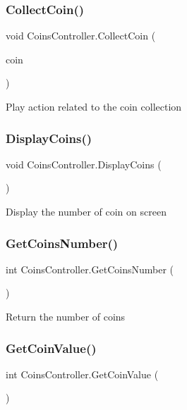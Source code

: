 \subsubsection{\texorpdfstring{Collect\+Coin()}{CollectCoin()}}
{\footnotesize\ttfamily void Coins\+Controller.\+Collect\+Coin (\begin{DoxyParamCaption}\item[{Game\+Object}]{coin }\end{DoxyParamCaption})}

Play action related to the coin collection \mbox{\label{class_coins_controller_a0ede17e1bf12716f77e4d1aefa9ba40a}} 
\subsubsection{\texorpdfstring{Display\+Coins()}{DisplayCoins()}}
{\footnotesize\ttfamily void Coins\+Controller.\+Display\+Coins (\begin{DoxyParamCaption}{ }\end{DoxyParamCaption})\hspace{0.3cm}{\ttfamily [private]}}

Display the number of coin on screen \mbox{\label{class_coins_controller_a6e0fbd9f7b9266080de287fe5f3dac83}} 
\subsubsection{\texorpdfstring{Get\+Coins\+Number()}{GetCoinsNumber()}}
{\footnotesize\ttfamily int Coins\+Controller.\+Get\+Coins\+Number (\begin{DoxyParamCaption}{ }\end{DoxyParamCaption})}

Return the number of coins \mbox{\label{class_coins_controller_a9daadf203b6626fa3ec7dfa0430c08e5}} 
\subsubsection{\texorpdfstring{Get\+Coin\+Value()}{GetCoinValue()}}
{\footnotesize\ttfamily int Coins\+Controller.\+Get\+Coin\+Value (\begin{DoxyParamCaption}{ }\end{DoxyParamCaption})}

